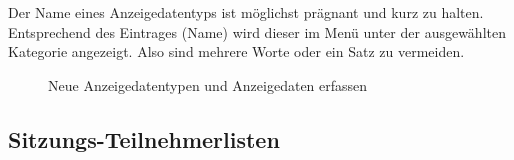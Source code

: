 \vspace{\baselineskip}

Der Name eines Anzeigedatentyps ist möglichst prägnant und kurz zu halten. Entsprechend des Eintrages (Name) wird dieser im Menü unter der ausgewählten Kategorie angezeigt. Also sind mehrere Worte oder ein Satz zu vermeiden.

\begin{figure}[H]
\end{figure}

\begin{figure}[H]
\caption{Neue Anzeigedatentypen und Anzeigedaten erfassen}
\end{figure}


\clearpage
\subsection{Sitzungs-Teilnehmerlisten}

